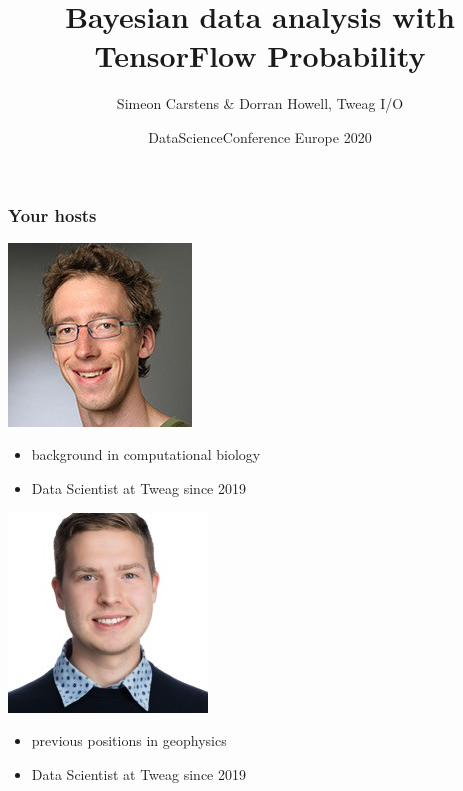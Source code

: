 \documentclass[t, aspectratio=169]{beamer}
\title{Bayesian data analysis with TensorFlow Probability}
\date{DataScienceConference Europe 2020}
\author{Simeon Carstens \& Dorran Howell, Tweag I/O}
\begin{document}
\begin{frame}
  \titlepage
\end{frame}


\begin{frame}
  \frametitle{Your hosts}
  \begin{tcolorbox}[title=Simeon will give the presentation]
    \begin{minipage}{0.3\textwidth}{
        \includegraphics[width=0.15\paperwidth]{images/simeon}}
    \end{minipage}
    \begin{minipage}{0.6\textwidth}
    \begin{itemize}
    \item background in computational biology
    \item Data Scientist at Tweag since 2019
    \end{itemize}
    \end{minipage}
  \end{tcolorbox}

  \begin{tcolorbox}[title=Dorran will happily answer questions]
    \begin{minipage}{0.3\textwidth}{
        \includegraphics[width=0.15\paperwidth]{images/dorran}}
    \end{minipage}
    \begin{minipage}{0.6\textwidth}
    \begin{itemize}
    \item previous positions in geophysics
    \item Data Scientist at Tweag since 2019
    \end{itemize}
    \end{minipage}
  \end{tcolorbox}
\end{frame}
\end{document}
